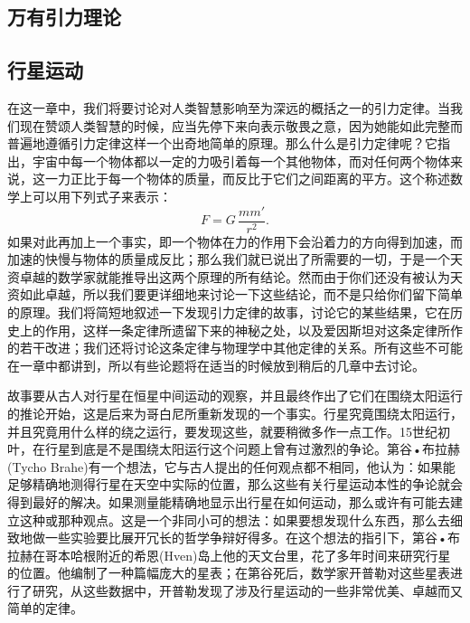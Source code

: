 \documentclass[12pt,oneside]{book}
\begin{document}
\begin{common-format}
\mainmatter

\chapter{万有引力理论}
\setcounter{chapter}{7}
\section{行星运动}
在这一章中，我们将要讨论对人类智慧影响至为深远的概括之一的引力定律。当我们现在赞颂人类智慧的时候，应当先停下来向表示敬畏之意，因为她能如此完整而普遍地遵循引力定律这样一个出奇地简单的原理。那么什么是引力定律呢？它指出，宇宙中每一个物体都以一定的力吸引着每一个其他物体，而对任何两个物体来说，这一力正比于每一个物体的质量，而反比于它们之间距离的平方。这个称述数学上可以用下列式子来表示：
\begin{equation*}
F=G\,\frac{mm'}{r^2}.
\end{equation*}
如果对此再加上一个事实，即一个物体在力的作用下会沿着力的方向得到加速，而加速的快慢与物体的质量成反比；那么我们就已说出了所需要的一切，于是一个天资卓越的数学家就能推导出这两个原理的所有结论。然而由于你们还没有被认为天资如此卓越，所以我们要更详细地来讨论一下这些结论，而不是只给你们留下简单的原理。我们将简短地叙述一下发现引力定律的故事，讨论它的某些结果，它在历史上的作用，这样一条定律所遗留下来的神秘之处，以及爱因斯坦对这条定律所作的若干改进；我们还将讨论这条定律与物理学中其他定律的关系。所有这些不可能在一章中都讲到，所以有些论题将在适当的时候放到稍后的几章中去讨论。

故事要从古人对行星在恒星中间运动的观察，并且最终作出了它们在围绕太阳运行的推论开始，这是后来为哥白尼所重新发现的一个事实。行星究竟围绕太阳运行，并且究竟用什么样的绕之运行，要发现这些，就要稍微多作一点工作。15世纪初叶，在行星到底是不是围绕太阳运行这个问题上曾有过激烈的争论。第谷•布拉赫(Tycho Brahe)有一个想法，它与古人提出的任何观点都不相同，他认为：如果能足够精确地测得行星在天空中实际的位置，那么这些有关行星运动本性的争论就会得到最好的解决。如果测量能精确地显示出行星在如何运动，那么或许有可能去建立这种或那种观点。这是一个非同小可的想法：如果要想发现什么东西，那么去细致地做一些实验要比展开冗长的哲学争辩好得多。在这个想法的指引下，第谷•布拉赫在哥本哈根附近的希恩(Hven)岛上他的天文台里，花了多年时间来研究行星的位置。他编制了一种篇幅庞大的星表；在第谷死后，数学家开普勒对这些星表进行了研究，从这些数据中，开普勒发现了涉及行星运动的一些非常优美、卓越而又简单的定律。




\end{common-format}
\end{document}
